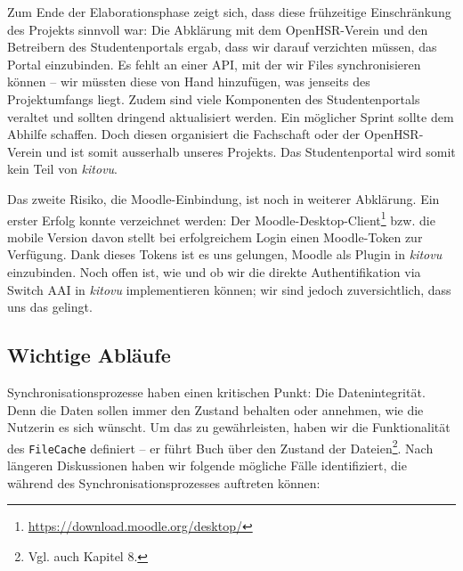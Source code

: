 \documentclass[a4paper]{article}
\begin{document}
Zum Ende der Elaborationsphase zeigt sich, dass diese frühzeitige Einschränkung des Projekts sinnvoll war: Die Abklärung mit dem OpenHSR-Verein und den Betreibern des Studentenportals ergab, dass wir darauf verzichten müssen, das Portal einzubinden. Es fehlt an einer API, mit der wir Files synchronisieren können -- wir müssten diese von Hand hinzufügen, was jenseits des Projektumfangs liegt. Zudem sind viele Komponenten des Studentenportals veraltet und sollten dringend aktualisiert werden. Ein möglicher Sprint sollte dem Abhilfe schaffen. Doch diesen organisiert die Fachschaft oder der OpenHSR-Verein und ist somit ausserhalb unseres Projekts. Das Studentenportal wird somit kein Teil von \emph{kitovu}. 

Das zweite Risiko, die Moodle-Einbindung, ist noch in weiterer Abklärung. Ein erster Erfolg konnte verzeichnet werden: Der Moodle-Desktop-Client\footnote{\url{https://download.moodle.org/desktop/}} bzw. die mobile Version davon stellt bei erfolgreichem Login einen Moodle-Token zur Verfügung. Dank dieses Tokens ist es uns gelungen, Moodle als Plugin in \emph{kitovu} einzubinden. Noch offen ist, wie und ob wir die direkte Authentifikation via Switch AAI in \emph{kitovu} implementieren können; wir sind jedoch zuversichtlich, dass uns das gelingt.

\subsection{Wichtige Abläufe}

Synchronisationsprozesse haben einen kritischen Punkt: Die Datenintegrität. Denn die Daten sollen immer den Zustand behalten oder annehmen, wie die Nutzerin es sich wünscht. Um das zu gewährleisten, haben wir die Funktionalität des \verb|FileCache| definiert -- er führt Buch über den Zustand der Dateien\footnote{Vgl. auch Kapitel 8.}. Nach längeren Diskussionen haben wir folgende mögliche Fälle identifiziert, die während des Synchronisationsprozesses auftreten können:
\end{document}
